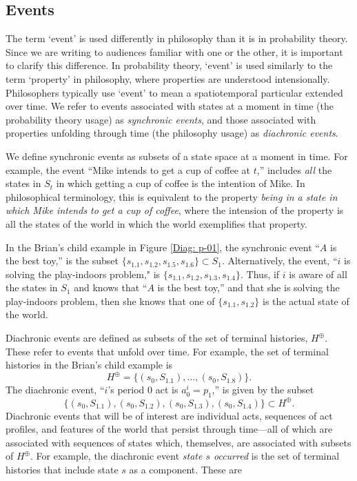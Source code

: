 \documentclass[
11pt,
titlepage,
reqno,
]{article}%
\theoremstyle{definition}
\begin{document}
	
\subsection{Events}

The term `event' is used differently in philosophy than it is in probability theory. 
Since we are writing to audiences familiar with one or the other, it is important to clarify this difference. 
In probability theory, `event' is used similarly to the term `property' in philosophy, where properties are understood intensionally. 
Philosophers typically use `event' to mean a spatiotemporal particular extended over time. 
We refer to events associated with states at a moment in time (the probability theory usage) as \textit{synchronic events}, and those associated with properties unfolding through time (the philosophy usage) as \textit{diachronic events}.

We define synchronic events as subsets of a state space at a moment in time. 
For example, the event ``Mike intends to get a cup of coffee at $t$,'' includes \textit{all} the states in $S_t$ in which getting a cup of coffee is the intention of Mike. 
In philosophical terminology, this is equivalent to the property \textit{being in a state in which Mike intends to get a cup of coffee}, where the intension of the property is all the states of the world in which the world exemplifies that property.

In the Brian's child example in Figure \ref{Diag: p-01}, the synchronic event ``$A$ is the best toy,'' is the subset $\{s_{1.1},s_{1.2},s_{1.5},s_{1.6}\}\subset S_1$.
Alternatively, the event, ``$i$ is solving the play-indoors problem," is $\{s_{1.1},s_{1.2},s_{1.3},s_{1.4}\}$.
Thus, if $i$ is aware of all the states in $S_1$ and knows that ``$A$ is the best toy,'' and that she is solving the play-indoors problem, then she knows that one of $\{s_{1.1},s_{1.2}\}$ is the actual state of the world.

Diachronic events are defined as subsets of the set of terminal histories, $H^\oplus$.
These refer to events that unfold over time.
For example, the set of terminal histories in the Brian's child example is
\[
	H^\oplus=\{(s_0,S_{1.1}),\ldots,(s_0,S_{1.8})\}.
\]
The diachronic event, ``$i$'s period 0 act is $a^i_0=p_1$,'' is given by the subset
\[
	\{(s_0,S_{1.1}),(s_0,S_{1.2}),(s_0,S_{1.3}),(s_0,S_{1.4})\}\subset H^\oplus.
\] 
Diachronic events that will be of interest are individual acts, sequences of act profiles, and features of the world that persist through time---all of which are associated with sequences of states which, themselves, are associated with subsets of $H^\oplus$.
For example, the diachronic event \textit{state $s$ occurred} is the set of terminal histories that include state $s$ as a component.
These are 
\end{document}
